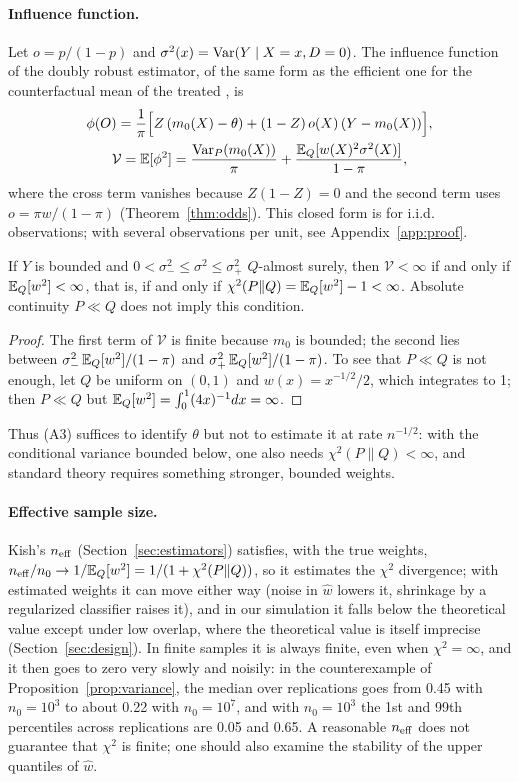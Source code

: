 \paragraph{Influence function.} Let $o=p/(1-p)$ and $\sigma^2(x)=\operatorname{Var}(Y\mid X=x,D=0)$. The influence function of the doubly robust estimator, of the same form as the efficient one for the counterfactual mean of the treated \citep{hahn1998}, is
\begin{gather*}
\phi(O)=\frac1\pi\Bigl[Z\,(m_0(X)-\theta)+(1-Z)\,o(X)\,(Y-m_0(X))\Bigr],\\
\mathcal V=\mathbb{E}[\phi^2]=\frac{\operatorname{Var}_P(m_0(X))}{\pi}+\frac{\mathbb{E}_Q[w(X)^2\sigma^2(X)]}{1-\pi},
\end{gather*}
where the cross term vanishes because $Z(1-Z)=0$ and the second term uses $o=\pi w/(1-\pi)$ (Theorem~\ref{thm:odds}). This closed form is for i.i.d. observations; with several observations per unit, see Appendix~\ref{app:proof}.

\begin{proposition}\label{prop:variance}
If $Y$ is bounded and $0<\sigma_-^2\le\sigma^2\le\sigma_+^2$ $Q$-almost surely, then $\mathcal V<\infty$ if and only if $\mathbb{E}_Q[w^2]<\infty$, that is, if and only if $\chi^2(P\|Q)=\mathbb{E}_Q[w^2]-1<\infty$. Absolute continuity $P\ll Q$ does not imply this condition.
\end{proposition}
\begin{proof}
The first term of $\mathcal V$ is finite because $m_0$ is bounded; the second lies between $\sigma_-^2\,\mathbb{E}_Q[w^2]/(1-\pi)$ and $\sigma_+^2\,\mathbb{E}_Q[w^2]/(1-\pi)$. To see that $P\ll Q$ is not enough, let $Q$ be uniform on $(0,1)$ and $w(x)=x^{-1/2}/2$, which integrates to 1; then $P\ll Q$ but $\mathbb{E}_Q[w^2]=\int_0^1(4x)^{-1}dx=\infty$.
\end{proof}

Thus (A3) suffices to identify $\theta$ but not to estimate it at rate $n^{-1/2}$: with the conditional variance bounded below, one also needs $\chi^2(P\|Q)<\infty$, and standard theory requires something stronger, bounded weights.

\paragraph{Effective sample size.} Kish's $n_{\mathrm{eff}}$ (Section~\ref{sec:estimators}) satisfies, with the true weights, $n_{\mathrm{eff}}/n_0\to1/\mathbb{E}_Q[w^2]=1/(1+\chi^2(P\|Q))$, so it estimates the $\chi^2$ divergence; with estimated weights it can move either way (noise in $\hat w$ lowers it, shrinkage by a regularized classifier raises it), and in our simulation it falls below the theoretical value except under low overlap, where the theoretical value is itself imprecise (Section~\ref{sec:design}). In finite samples it is always finite, even when $\chi^2=\infty$, and it then goes to zero very slowly and noisily: in the counterexample of Proposition~\ref{prop:variance}, the median over replications goes from 0.45 with $n_0=10^3$ to about 0.22 with $n_0=10^7$, and with $n_0=10^3$ the 1st and 99th percentiles across replications are 0.05 and 0.65. A reasonable $n_{\mathrm{eff}}$ does not guarantee that $\chi^2$ is finite; one should also examine the stability of the upper quantiles of $\hat w$.


